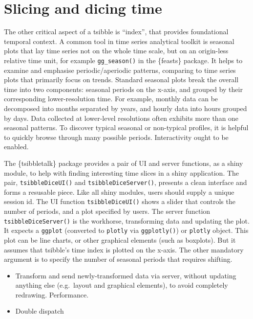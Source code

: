 \hypertarget{slicing-and-dicing-time}{%
\section{Slicing and dicing time}\label{slicing-and-dicing-time}}

The other critical aspect of a tsibble is ``index'', that provides
foundational temporal context. A common tool in time series analytical
toolkit is seasonal plots that lay time series not on the whole time
scale, but on an origin-less relative time unit, for example
\texttt{gg\_season()} in the \{feasts\} package. It helps to examine and
emphasise periodic/aperiodic patterns, comparing to time series plots
that primarily focus on trends. Standard seasonal plots break the
overall time into two components: seasonal periods on the x-axis, and
grouped by their corresponding lower-resolution time. For example,
monthly data can be decomposed into months separated by years, and
hourly data into hours grouped by days. Data collected at lower-level
resolutions often exhibits more than one seasonal patterns. To discover
typical seasonal or non-typical profiles, it is helpful to quickly
browse through many possible periods. Interactivity ought to be enabled.

The \{tsibbletalk\} package provides a pair of UI and server functions,
as a shiny module, to help with finding interesting time slices in a
shiny application. The pair, \texttt{tsibbleDiceUI()} and
\texttt{tsibbleDiceServer()}, presents a clean interface and forms a
resusable piece. Like all shiny modules, users should supply a unique
session id. The UI function \texttt{tsibbleDiceUI()} shows a slider that
controls the number of periods, and a plot specified by users. The
server function \texttt{tsibbleDiceServer()} is the workhorse,
transforming data and updating the plot. It expects a \texttt{ggplot}
(converted to \texttt{plotly} via \texttt{ggplotly()}) or
\texttt{plotly} object. This plot can be line charts, or other graphical
elements (such as boxplots). But it assumes that tsibble's time index is
plotted on the x-axis. The other mandatory argument is to specify the
number of seasonal periods that requires shifting.

\begin{itemize}
\tightlist
\item
  Transform and send newly-transformed data via server, without updating
  anything else (e.g.~layout and graphical elements), to avoid
  completely redrawing. Performance.
\item
  Double dispatch
\end{itemize}


